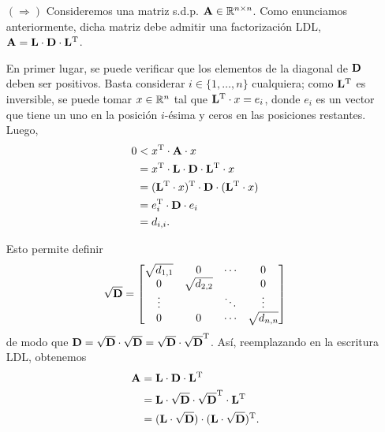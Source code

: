 \begin{itemize}
\item[$(\Rightarrow)$] Consideremos una matriz s.d.p. $\mathbf{A} \in
    \mathbb{R}^{n \times n}$. Como enunciamos anteriormente, dicha matriz debe
    admitir una factorización LDL,
    $\mathbf{A} = \mathbf{L} \cdot \mathbf{D} \cdot \mathbf{L}^{\mathrm{T}}$.

    En primer lugar, se puede verificar que los elementos de la diagonal de
    $\mathbf{D}$ deben ser positivos.
    Basta considerar $i \in \{1, \dots, n\}$ cualquiera; como
    $\mathbf{L}^{\mathrm{T}}$ es inversible, se
    puede tomar $x \in \mathbb{R}^n$ tal que $\mathbf{L}^{\mathrm{T}} \cdot x = e_i$, donde
    $e_i$ es un vector que tiene un uno en la posición $i$-ésima y ceros en
    las posiciones restantes. Luego,
    \[ \begin{aligned}
        0 &< x^{\mathrm{T}} \cdot \mathbf{A} \cdot x \\
          &= x^{\mathrm{T}} \cdot \mathbf{L} \cdot \mathbf{D} \cdot \mathbf{L}^{\mathrm{T}} \cdot x \\
          &= (\mathbf{L}^{\mathrm{T}} \cdot x)^{\mathrm{T}} \cdot \mathbf{D} \cdot
             (\mathbf{L}^{\mathrm{T}} \cdot x) \\
          &= e_i^{\mathrm{T}} \cdot \mathbf{D} \cdot e_i \\
          &= d_{i,i}.
    \end{aligned} \]

    Esto permite definir
    \[ \mathbf{\sqrt{D}} = \begin{bmatrix}
        \sqrt{d_{1,1}} & 0              & \cdots & 0 \\
        0              & \sqrt{d_{2,2}} &        & 0 \\
        \vdots         &                & \ddots & \vdots \\
        0              & 0              & \cdots & \sqrt{d_{n,n}}
    \end{bmatrix} \]
    de modo que $\mathbf{D} = \mathbf{\sqrt{D}} \cdot \mathbf{\sqrt{D}} =
    \mathbf{\sqrt{D}} \cdot \mathbf{\sqrt{D}}^{\mathrm{T}}$. Así, reemplazando en la
    escritura LDL, obtenemos
    \[ \begin{aligned} \mathbf{A}
        &= \mathbf{L} \cdot \mathbf{D} \cdot \mathbf{L}^{\mathrm{T}} \\
        &= \mathbf{L} \cdot \mathbf{\sqrt{D}} \cdot \mathbf{\sqrt{D}}^{\mathrm{T}}
            \cdot \mathbf{L}^{\mathrm{T}} \\
        &= (\mathbf{L} \cdot \mathbf{\sqrt{D}}) \cdot
            (\mathbf{L} \cdot \mathbf{\sqrt{D}})^{\mathrm{T}}. \\
    \end{aligned} \]


\end{itemize}
